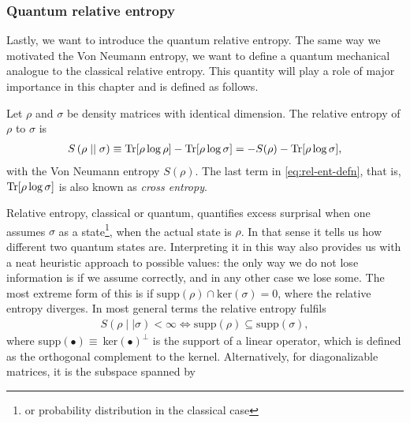 \subsubsection{Quantum relative entropy}
Lastly, we want to introduce the quantum relative entropy. 
The same way we
motivated the Von Neumann entropy, we want to define a quantum mechanical
analogue to the classical relative entropy. This quantity will play a role of
major importance in this chapter and is defined as follows.
\begin{defn}\label{defn:rel-ent}
  Let $\rho$ and $\sigma$ be density matrices with identical dimension. The
  relative entropy of $\rho$ to $\sigma$ is
  \begin{align}\label{eq:rel-ent-defn}
    S\left(\rho\mid\mid\sigma\right) \equiv \Tr[\rho\log\rho] -
    \Tr[\rho\log\sigma] = -S(\rho) - \Tr[\rho\log\sigma]
  ,\end{align}
  with the Von Neumann entropy $S(\rho)$.
  The last term in \cref{eq:rel-ent-defn}, that is, $\Tr[\rho\log\sigma]$ is also
  known as \emph{cross entropy}. 
\end{defn}
Relative entropy, classical or quantum, quantifies excess surprisal when
one assumes $\sigma$ as a state\footnote{or probability distribution in the
classical case}, when the actual state is $\rho$. In that sense it tells us how
different two quantum states are. Interpreting it in this way also provides us
with a neat heuristic approach to possible values: the only way we do not lose
information is if we assume correctly, and in any other case we lose some. The
most extreme form of this is if $\mathrm{supp}(\rho)\cap\mathrm{ker}(\sigma)={0}$, where the
relative entropy diverges. In most general terms the relative entropy fulfils
\begin{align}\label{eq:inf-cond}
  S(\rho\mid\mid\sigma) < \infty \Longleftrightarrow \mathrm{supp}(\rho) \subseteq
  \mathrm{supp}(\sigma)
,\end{align}
where supp$(\bullet)\equiv\ $ker$(\bullet)^\perp$ is the support of a linear
operator, which is defined as the orthogonal complement to the kernel.
Alternatively, for diagonalizable matrices, it is the subspace spanned by
